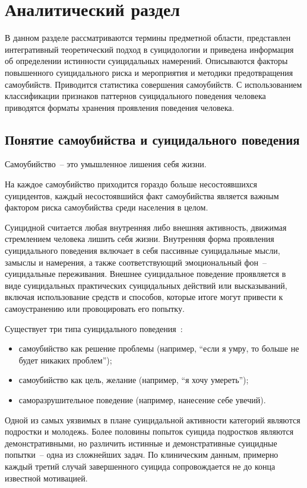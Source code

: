 \section{Аналитический раздел}

В данном разделе рассматриваются термины предметной области, представлен интегративный теоретический подход в суицидологии и приведена информация об определении истинности суицидальных намерений. 
Описываются факторы повышенного суицидального риска и мероприятия и методики предотвращения самоубийств. Приводится статистика совершения самоубийств.
С использованием классификации признаков паттернов суицидального поведения человека приводятся форматы хранения проявления поведения человека.

\subsection{Понятие самоубийства и суицидального поведения}
Самоубийство~-- это умышленное лишения себя жизни.~\cite{fuckingSuicideDefinition}

На каждое самоубийство приходится гораздо больше несостоявшихся суицидентов, каждый несостоявшийся факт самоубийства является важным фактором риска самоубийства среди населения в целом.~\cite{suicideVOZDouble}

Суицидной считается любая внутренняя либо внешняя активность, движимая стремлением человека лишить себя жизни. Внутренняя форма проявления суицидального поведения включает в себя пассивные суицидальные мысли, замыслы и намерения, а также соответствующий эмоциональный фон~-- суицидальные переживания. Внешнее суицидальное поведение проявляется в виде суицидальных практических суицидальных действий или высказываний, включая использование средств и способов, которые  итоге могут привести к самоустранению или провоцировать его попытку.~\cite{suicidalContent}

Существует три типа суицидального поведения~\cite{Kasyanov}:
\begin{itemize}
\item самоубийство как решение проблемы (например, ``если я умру, то больше не будет никаких проблем'');
\item самоубийство как цель, желание (например, ``я хочу умереть'');
\item саморазрушительное поведение (например, нанесение себе увечий).
\end{itemize}

Одной из самых уязвимых в плане суицидальной активности категорий являются подростки и молодежь. Более половины попыток суицида подростков являются демонстративными, но различить истинные и демонстративные суицидные попытки~-- одна из сложнейших задач. По клиническим данным, примерно каждый третий случай завершенного суицида сопровождается не до конца известной мотивацией.~\cite{suicidalContent}

